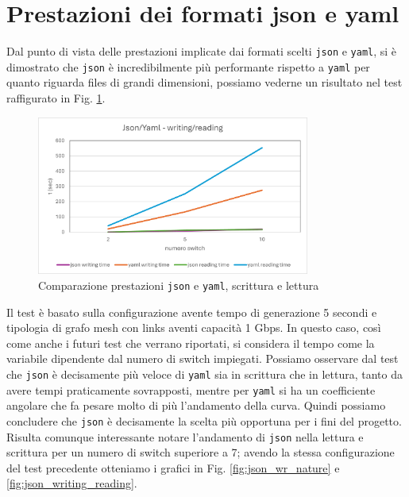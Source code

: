 \documentclass[binding=0.6cm]{sapthesis}
\begin{document}
\section{Prestazioni dei formati json e yaml}
Dal punto di vista delle prestazioni implicate
dai formati scelti \texttt{json} e \texttt{yaml}, si è dimostrato che \texttt{json} è incredibilmente più performante rispetto a \texttt{yaml} per quanto riguarda files di grandi dimensioni, possiamo vederne un risultato nel test raffigurato in Fig. \ref{fig:json_yaml_wr_comparison}.

\begin{figure}[h]
    \centering
    \includegraphics[width=0.8\textwidth]{immagini/json_yaml_wr_comparison.png}
    \caption{Comparazione prestazioni \texttt{json} e \texttt{yaml}, scrittura e lettura}
    \label{fig:json_yaml_wr_comparison}
\end{figure}

Il test è basato sulla configurazione avente tempo di generazione 5 secondi e tipologia di grafo mesh con links aventi capacità 1 Gbps.
In questo caso, così come anche i futuri test che verrano riportati, si considera il tempo come la variabile dipendente dal numero di switch impiegati.
Possiamo osservare dal test che \texttt{json} è decisamente più veloce di \texttt{yaml} sia in scrittura che in lettura, tanto da avere tempi praticamente sovrapposti, mentre per \texttt{yaml} si ha un coefficiente angolare che fa pesare molto di più l'andamento della curva. Quindi possiamo concludere che \texttt{json} è decisamente la scelta più opportuna 
per i fini del progetto. Risulta comunque interessante notare l'andamento di \texttt{json} nella lettura e scrittura per un numero di switch superiore a 7; avendo la stessa configurazione del test precedente otteniamo i grafici in Fig. \ref{fig:json_wr_nature} e \ref{fig:json_writing_reading}.
\end{document}
